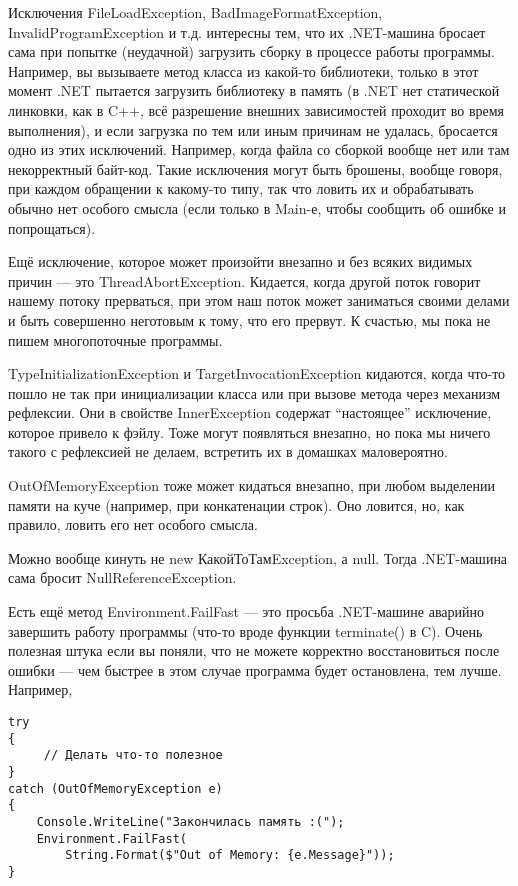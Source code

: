 \documentclass[a5paper]{article}
\begin{document}
Исключения FileLoadException, BadImageFormatException, InvalidProgramException и т.д. интересны тем, что их .NET-машина бросает сама при попытке (неудачной) загрузить сборку в процессе работы программы. Например, вы вызываете метод класса из какой-то библиотеки, только в этот момент .NET пытается загрузить библиотеку в память (в .NET нет статической линковки, как в C++, всё разрешение внешних зависимостей проходит во время выполнения), и если загрузка по тем или иным причинам не удалась, бросается одно из этих исключений. Например, когда файла со сборкой вообще нет или там некорректный байт-код. Такие исключения могут быть брошены, вообще говоря, при каждом обращении к какому-то типу, так что ловить их и обрабатывать обычно нет особого смысла (если только в Main-е, чтобы сообщить об ошибке и попрощаться).

Ещё исключение, которое может произойти внезапно и без всяких видимых причин --- это ThreadAbortException. Кидается, когда другой поток говорит нашему потоку прерваться, при этом наш поток может заниматься своими делами и быть совершенно неготовым к тому, что его прервут. К счастью, мы пока не пишем многопоточные программы.

TypeInitializationException и TargetInvocationException кидаются, когда что-то пошло не так при инициализации класса или при вызове метода через механизм рефлексии. Они в свойстве InnerException содержат ``настоящее'' исключение, которое привело к фэйлу. Тоже могут появляться внезапно, но пока мы ничего такого с рефлексией не делаем, встретить их в домашках маловероятно.

OutOfMemoryException тоже может кидаться внезапно, при любом выделении памяти на куче (например, при конкатенации строк). Оно ловится, но, как правило, ловить его нет особого смысла.

Можно вообще кинуть не new КакойТоТамException, а null. Тогда .NET-машина сама бросит NullReferenceException.

Есть ещё метод Environment.FailFast --- это просьба .NET-машине аварийно завершить работу программы (что-то вроде функции terminate() в C). Очень полезная штука если вы поняли, что не можете корректно восстановиться после ошибки --- чем быстрее в этом случае программа будет остановлена, тем лучше. Например,

\begin{verbatim}
try 
{
     // Делать что-то полезное
}
catch (OutOfMemoryException e) 
{
    Console.WriteLine("Закончилась память :(");
    Environment.FailFast(
        String.Format($"Out of Memory: {e.Message}"));
}
\end{verbatim}
\end{document}
